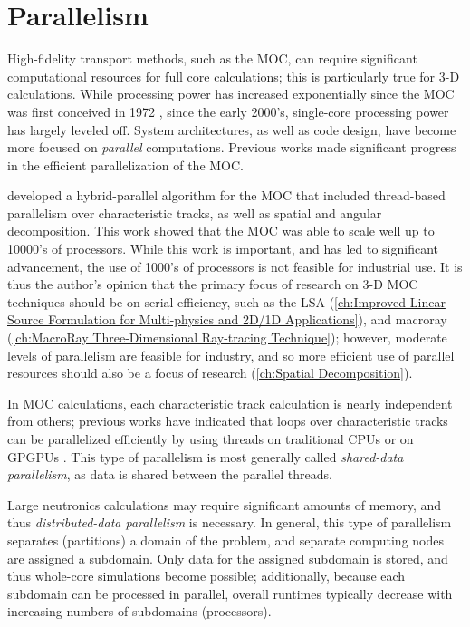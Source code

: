 {    \section{Parallelism}{\label{sec:MOC:Parallelism}
        High-fidelity transport methods, such as the \ac{MOC}, can require significant computational resources for full core calculations; this is particularly true for 3-D calculations.
        While processing power has increased exponentially since the \ac{MOC} was first conceived in 1972 \cite{Askew1972}, since the early 2000's, single-core processing power has largely leveled off.
        System architectures, as well as code design, have become more focused on \emph{parallel} computations.
        Previous works \cite{Kochunas2013} made significant progress in the efficient parallelization of the \ac{MOC}.

        \citet{Kochunas2013} developed a hybrid-parallel algorithm for the \ac{MOC} that included thread-based parallelism over characteristic tracks, as well as spatial and angular decomposition.
        This work showed that the \ac{MOC} was able to scale well up to 10000's of processors.
        While this work is important, and has led to significant advancement, the use of 1000's of processors is not feasible for industrial use.
        It is thus the author's opinion that the primary focus of research on 3-D \ac{MOC} techniques should be on serial efficiency, such as the \acf{LSA} (\cref{ch:Improved Linear Source Formulation for Multi-physics and 2D/1D Applications}), and macroray (\cref{ch:MacroRay Three-Dimensional Ray-tracing Technique});
        however, moderate levels of parallelism are feasible for industry, and so more efficient use of parallel resources should also be a focus of research (\cref{ch:Spatial Decomposition}).

        In \ac{MOC} calculations, each characteristic track calculation is nearly independent from others; previous works have indicated that loops over characteristic tracks can be parallelized efficiently by using threads on traditional \acp{CPU} \cite{Kochunas2013} or on \acp{GPGPU} \cite{Boyd2014}.
        This type of parallelism is most generally called \emph{shared-data parallelism}, as data is shared between the parallel threads.

        Large neutronics calculations may require significant amounts of memory, and thus \emph{distributed-data parallelism} is necessary.
        In general, this type of parallelism separates (partitions) a domain of the problem, and separate computing nodes are assigned a subdomain.
        Only data for the assigned subdomain is stored, and thus whole-core simulations become possible; additionally, because each subdomain can be processed in parallel, overall runtimes typically decrease with increasing numbers of subdomains (processors).

}}
